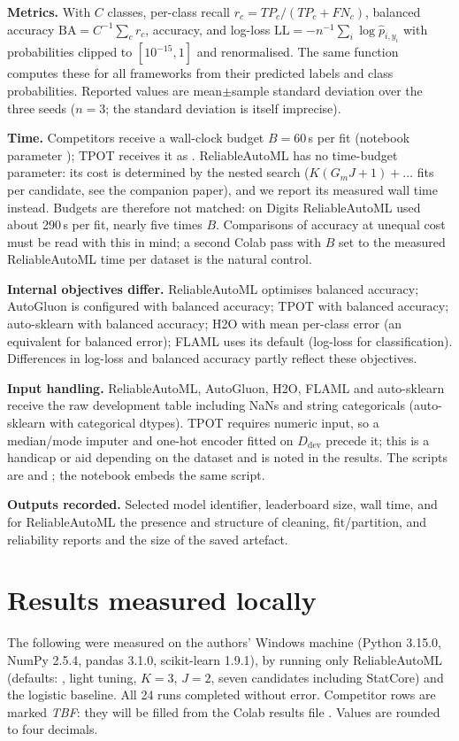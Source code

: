 \documentclass[conference]{IEEEtran}
\newcommand{\tbf}{\textit{TBF}}
\begin{document}
\textbf{Metrics.} With $C$ classes, per-class recall $r_c=TP_c/(TP_c+FN_c)$, balanced accuracy $\mathrm{BA}=C^{-1}\sum_c r_c$, accuracy, and log-loss $\mathrm{LL}=-n^{-1}\sum_i\log\hat p_{i,y_i}$ with probabilities clipped to $[10^{-15},1]$ and renormalised. The same function computes these for all frameworks from their predicted labels and class probabilities. Reported values are mean$\pm$sample standard deviation over the three seeds ($n=3$; the standard deviation is itself imprecise).

\textbf{Time.} Competitors receive a wall-clock budget $B=60$\,s per fit (notebook parameter ); TPOT receives it as . ReliableAutoML has no time-budget parameter: its cost is determined by the nested search ($K(G_mJ+1)+\ldots$ fits per candidate, see the companion paper), and we report its measured wall time instead. Budgets are therefore not matched: on Digits ReliableAutoML used about 290\,s per fit, nearly five times $B$. Comparisons of accuracy at unequal cost must be read with this in mind; a second Colab pass with $B$ set to the measured ReliableAutoML time per dataset is the natural control.

\textbf{Internal objectives differ.} ReliableAutoML optimises balanced accuracy; AutoGluon is configured with balanced accuracy; TPOT with balanced accuracy; auto-sklearn with balanced accuracy; H2O with mean per-class error (an equivalent for balanced error); FLAML uses its default (log-loss for classification). Differences in log-loss and balanced accuracy partly reflect these objectives.

\textbf{Input handling.} ReliableAutoML, AutoGluon, H2O, FLAML and auto-sklearn receive the raw development table including NaNs and string categoricals (auto-sklearn with categorical dtypes). TPOT requires numeric input, so a median/mode imputer and one-hot encoder fitted on $D_{\mathrm{dev}}$ precede it; this is a handicap or aid depending on the dataset and is noted in the results. The scripts are  and ; the notebook embeds the same script.

\textbf{Outputs recorded.} Selected model identifier, leaderboard size, wall time, and for ReliableAutoML the presence and structure of cleaning, fit/partition, and reliability reports and the size of the saved artefact.

\section{Results measured locally}
The following were measured on the authors' Windows machine (Python 3.15.0, NumPy 2.5.4, pandas 3.1.0, scikit-learn 1.9.1), by running only ReliableAutoML (defaults: , light tuning, $K=3$, $J=2$, seven candidates including StatCore) and the logistic baseline. All 24 runs completed without error. Competitor rows are marked \tbf: they will be filled from the Colab results file . Values are rounded to four decimals.
\end{document}
